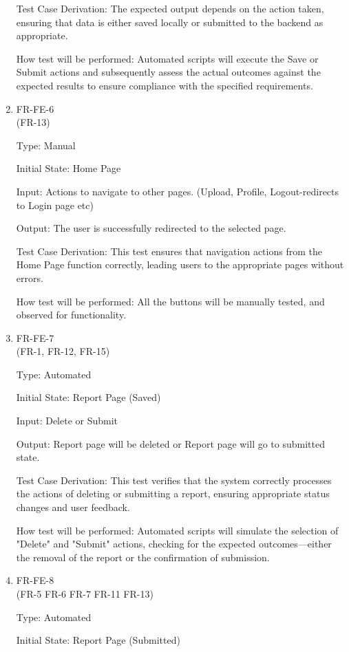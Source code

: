 \documentclass[12pt, titlepage]{article}
\begin{document}
\begin{enumerate}
Test Case Derivation: The expected output depends on the action taken, ensuring that data is either saved locally or submitted to the backend as appropriate.

How test will be performed: Automated scripts will execute the Save or Submit actions and subsequently assess the actual outcomes against the expected results to ensure compliance with the specified requirements.

\item{FR-FE-6\\} (FR-13)

Type: Manual
					
Initial State: Home Page 
					
Input: Actions to navigate to other pages. (Upload, Profile, Logout-redirects to Login page etc)
					
Output: The user is successfully redirected to the selected page.

Test Case Derivation: This test ensures that navigation actions from the Home Page function correctly, leading users to the appropriate pages without errors.

How test will be performed: All the buttons will be manually tested, and observed for functionality.

\item{FR-FE-7\\} (FR-1, FR-12, FR-15)

Type: Automated
					
Initial State: Report Page (Saved)
					
Input: Delete or Submit
					
Output: Report page will be deleted or Report page will go to submitted state.

Test Case Derivation: This test verifies that the system correctly processes the actions of deleting or submitting a report, ensuring appropriate status changes and user feedback.

How test will be performed: Automated scripts will simulate the selection of "Delete" and "Submit" actions, checking for the expected outcomes—either the removal of the report or the confirmation of submission.

\item{FR-FE-8\\} (FR-5 FR-6 FR-7 FR-11 FR-13)

Type: Automated
					
Initial State: Report Page (Submitted)
					

\end{enumerate}
\end{document}
